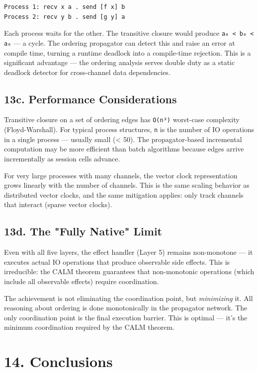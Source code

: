 \documentclass[11pt]{article}
\begin{document}
\begin{verbatim}
Process 1: recv x a . send [f x] b
Process 2: recv y b . send [g y] a
\end{verbatim}

Each process waits for the other. The transitive closure would produce
\texttt{a₀ < b₀ < a₀} — a cycle. The ordering propagator can detect this and raise
an error at compile time, turning a runtime deadlock into a compile-time
rejection. This is a significant advantage — the ordering analysis serves
double duty as a static deadlock detector for cross-channel data dependencies.
\subsection{13c. Performance Considerations}
\label{sec:org8d00b09}

Transitive closure on a set of ordering edges has \texttt{O(n³)} worst-case complexity
(Floyd-Warshall). For typical process structures, \texttt{n} is the number of IO
operations in a single process — usually small (< 50). The propagator-based
incremental computation may be more efficient than batch algorithms because
edges arrive incrementally as session cells advance.

For very large processes with many channels, the vector clock representation
grows linearly with the number of channels. This is the same scaling behavior
as distributed vector clocks, and the same mitigation applies: only track
channels that interact (sparse vector clocks).
\subsection{13d. The "Fully Native" Limit}
\label{sec:org63919da}

Even with all five layers, the effect handler (Layer 5) remains non-monotone —
it executes actual IO operations that produce observable side effects. This is
irreducible: the CALM theorem guarantees that non-monotonic operations (which
include all observable effects) require coordination.

The achievement is not eliminating the coordination point, but \emph{minimizing} it.
All reasoning about ordering is done monotonically in the propagator network.
The only coordination point is the final execution barrier. This is optimal —
it's the minimum coordination required by the CALM theorem.
\section{14. Conclusions}
\label{sec:org9d5ba8c}
\end{document}
